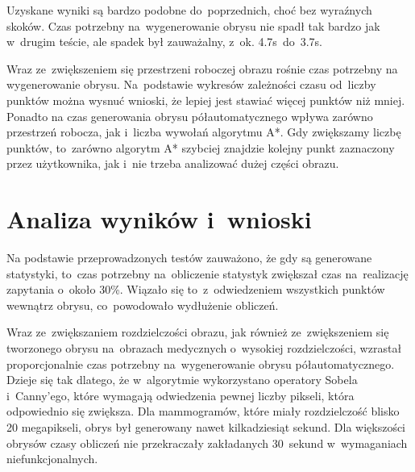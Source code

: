 \documentclass[a4paper,11pt,twoside,openright]{report}
\theoremstyle{definition}
\begin{document}
Uzyskane wyniki są bardzo podobne do~poprzednich, choć bez wyraźnych skoków.
Czas potrzebny na~wygenerowanie obrysu nie spadł tak bardzo jak w~drugim teście,
ale spadek był zauważalny, z~ok. 4.7s~do~3.7s.

Wraz ze~zwiększeniem się przestrzeni roboczej obrazu rośnie czas potrzebny na
wygenerowanie obrysu. Na~podstawie wykresów zależności czasu od~liczby punktów
można wysnuć wnioski, że lepiej jest stawiać więcej punktów niż mniej. Ponadto na czas generowania
obrysu półautomatycznego wpływa zarówno przestrzeń robocza, jak i~liczba wywołań algorytmu A*. Gdy zwiększamy
liczbę punktów, to~zarówno algorytm A* szybciej znajdzie kolejny punkt zaznaczony przez użytkownika, jak i~nie
trzeba analizować dużej części obrazu.

\section {Analiza wyników i~wnioski}


Na podstawie przeprowadzonych testów
zauważono, że gdy są generowane statystyki, to~czas potrzebny na~obliczenie statystyk
zwiększał czas na~realizację zapytania o~około 30\%. Wiązało się to~z~odwiedzeniem
wszystkich punktów wewnątrz obrysu, co~powodowało wydłużenie obliczeń.

Wraz ze~zwiększaniem rozdzielczości obrazu, jak również ze~zwiększeniem się
tworzonego obrysu na~obrazach medycznych o~wysokiej rozdzielczości, wzrastał proporcjonalnie
czas potrzebny na~wygenerowanie obrysu półautomatycznego. Dzieje się tak dlatego,
że w~algorytmie wykorzystano operatory Sobela i~Canny'ego, które wymagają odwiedzenia
pewnej liczby pikseli, która odpowiednio się zwiększa. Dla mammogramów, które miały rozdzielczość
blisko 20 megapikseli, obrys był generowany nawet kilkadziesiąt sekund. Dla większości obrysów
czasy obliczeń nie przekraczały zakładanych 30~sekund w~wymaganiach niefunkcjonalnych.
\end{document}

